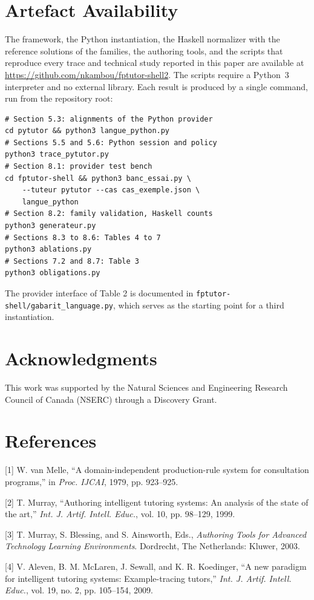 \documentclass[10pt,twocolumn,letterpaper]{article}
\begin{document}
\section{Artefact Availability}
The framework, the Python instantiation, the Haskell normalizer with the
reference solutions of the families, the authoring tools, and the scripts
that reproduce every trace and technical study reported in this paper are
available at \url{https://github.com/nkambou/fptutor-shell2}. The scripts
require a Python~3 interpreter and no external library. Each result is
produced by a single command, run from the repository root:
\begin{verbatim}
# Section 5.3: alignments of the Python provider
cd pytutor && python3 langue_python.py
# Sections 5.5 and 5.6: Python session and policy
python3 trace_pytutor.py
# Section 8.1: provider test bench
cd fptutor-shell && python3 banc_essai.py \
    --tuteur pytutor --cas cas_exemple.json \
    langue_python
# Section 8.2: family validation, Haskell counts
python3 generateur.py
# Sections 8.3 to 8.6: Tables 4 to 7
python3 ablations.py
# Sections 7.2 and 8.7: Table 3
python3 obligations.py
\end{verbatim}
The provider interface of Table 2 is documented in
\texttt{fptutor-shell/gabarit\_language.py}, which serves as the starting
point for a third instantiation.

\section*{Acknowledgments}
This work was supported by the Natural Sciences and Engineering Research
Council of Canada (NSERC) through a Discovery Grant.

\section*{References}
[1] W. van Melle, ``A domain-independent production-rule system for
consultation programs,'' in \emph{Proc. IJCAI}, 1979, pp. 923--925.

[2] T. Murray, ``Authoring intelligent tutoring systems: An analysis
of the state of the art,'' \emph{Int. J. Artif. Intell. Educ.}, vol. 10, pp. 98--129, 1999.

[3] T. Murray, S. Blessing, and S. Ainsworth, Eds., \emph{Authoring
Tools for Advanced Technology Learning Environments}. Dordrecht, The
Netherlands: Kluwer, 2003.

[4] V. Aleven, B. M. McLaren, J. Sewall, and K. R. Koedinger, ``A
new paradigm for intelligent tutoring systems: Example-tracing tutors,''
\emph{Int. J. Artif. Intell. Educ.}, vol. 19, no. 2,
pp. 105--154, 2009.
\end{document}
